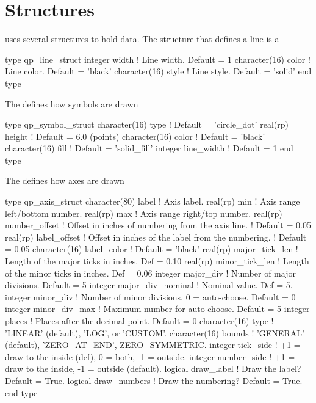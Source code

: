 \section{Structures}
\label{s:qp.structs}

\quickplot uses several structures to hold data. The structure that
defines a line is a 
\begin{example}
  type qp_line_struct
    integer width         ! Line width. Default = 1
    character(16) color   ! Line color. Default = 'black'
    character(16) style   ! Line style. Default = 'solid'
  end type
\end{example}

The  defines how symbols are drawn 
\begin{example}
  type qp_symbol_struct
    character(16)  type        ! Default = 'circle_dot'
    real(rp) height            ! Default = 6.0 (points)
    character(16)  color       ! Default = 'black'
    character(16)  fill        ! Default = 'solid_fill'
    integer  line_width        ! Default = 1
  end type
\end{example}

The  defines how axes are drawn 
\begin{example}
  type qp_axis_struct
    character(80) label       ! Axis label.
    real(rp) min              ! Axis range left/bottom number.
    real(rp) max              ! Axis range right/top number.
    real(rp) number_offset    ! Offset in inches of numbering from the axis line. 
                              !  Default = 0.05
    real(rp) label_offset     ! Offset in inches of the label from the numbering.
                              !  Default = 0.05
    character(16) label_color ! Default = 'black'
    real(rp) major_tick_len   ! Length of the major ticks in inches. Def = 0.10
    real(rp) minor_tick_len   ! Length of the minor ticks in inches. Def = 0.06
    integer major_div         ! Number of major divisions. Default = 5
    integer major_div_nominal ! Nominal value. Def = 5.
    integer minor_div         ! Number of minor divisions. 0 = auto-choose. Default = 0
    integer minor_div_max     ! Maximum number for auto choose. Default = 5
    integer places            ! Places after the decimal point. Default = 0
    character(16) type        ! 'LINEAR' (default), 'LOG', or 'CUSTOM'.
    character(16) bounds      ! 'GENERAL' (default), 'ZERO_AT_END', ZERO_SYMMETRIC.
    integer tick_side         ! +1 = draw to the inside (def), 0 = both, -1 = outside.
    integer number_side       ! +1 = draw to the inside, -1 = outside (default).
    logical draw_label        ! Draw the label? Default = True.
    logical draw_numbers      ! Draw the numbering? Default = True.
  end type
\end{example}

